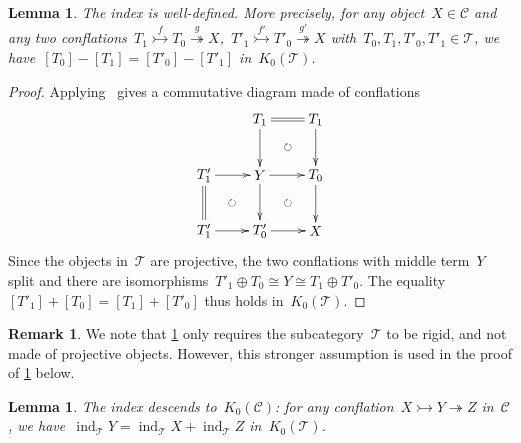 \documentclass{amsart}
\newtheorem{lemma}[theorem]{Lemma}
\theoremstyle{definition}
\newtheorem{remark}[theorem]{Remark}
\newcommand{\cat}{\mathcal{C}}
\newcommand{\ind}{\operatorname{ind}}
\newcommand{\tc}{\mathcal{T}}
\newcommand{\infl}{\rightarrowtail}
\newcommand{\defl}{\twoheadrightarrow}
\newcommand{\kzero}[1]{K_0(#1)}
\begin{document}
\begin{lemma}
\label{lem:index well-defined extricat}
 The index is well-defined. More precisely, for any object~$X\in\cat$ and any two conflations~$T_1\overset{f}{\infl} T_0 \overset{g}{\defl} X$,~$T'_1\overset{f'}{\infl} T'_0 \overset{g'}{\defl} X$ with~$T_0,T_1,T'_0,T'_1\in\tc$, we have~$[T_0]-[T_1]=[T'_0]-[T'_1]$ in~$\kzero{\tc}$.
\end{lemma}

\begin{proof}
Applying~\cite[Prop.~3.15]{NakaokaPalu} gives a commutative diagram made of conflations
\[
\xy
%
(-7,21)*+{T_1}="-12";
(7,21)*+{T_1}="-14";
%
(-21,7)*+{T'_1}="0";
(-7,7)*+{Y}="2";
(7,7)*+{T_0}="4";
%
(-21,-7)*+{T'_1}="10";
(-7,-7)*+{T'_0}="12";
(7,-7)*+{X}="14";
%
{\ar@{=} "-12";"-14"};
%
{\ar "-12";"2"};
{\ar "-14";"4"};
%
{\ar "0";"2"};
{\ar "2";"4"};
%
{\ar@{=} "0";"10"};
{\ar "2";"12"};
{\ar "4";"14"};
%
{\ar "10";"12"};
{\ar "12";"14"};
%
{\ar@{}|\circlearrowright "-12";"4"};
{\ar@{}|\circlearrowright "0";"12"};
{\ar@{}|\circlearrowright "2";"14"};
\endxy
\]
Since the objects in~$\tc$ are projective, the two conflations with middle term~$Y$ split and there are isomorphisms~$T'_1\oplus T_0 \cong Y \cong T_1\oplus T'_0$.
The equality~$[T'_1]+[T_0]=[T_1]+[T'_0]$ thus holds in~$\kzero{\tc}$.
\end{proof}

\begin{remark}
We note that \cref{lem:index well-defined extricat} only requires the subcategory~$\tc$ to be rigid, and not made of projective objects.
However, this stronger assumption is used in the proof of \cref{lem:index kzero extricat} below.
\end{remark}

\begin{lemma}
\label{lem:index kzero extricat}
The index descends to~$\kzero{\cat}$: for any conflation~$X\infl Y\defl Z$ in~$\cat$, we have~$\ind_\tc Y = \ind_\tc X + \ind_\tc Z$ in~$\kzero{\tc}$.
\end{lemma}
\end{document}
